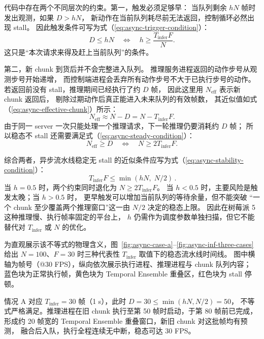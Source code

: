 代码中存在两个不同层次的约束。第一，触发必须足够早：
当队列剩余 $hN$ 帧时发出观测，如果 $D>hN$，
新动作在当前队列耗尽前无法返回，控制循环必然出现 stall。
因此触发条件可写为式（\ref{eq:async-trigger-condition}）：
\begin{equation}
  D \leq hN
  \quad\Longleftrightarrow\quad
  h \geq \frac{T_{\text{infer}}F}{N}.
  \label{eq:async-trigger-condition}
\end{equation}
这只是“本次请求来得及赶上当前队列”的条件。

第二，新 chunk 到货后并不会完整进入队列。
推理服务进程返回的动作步号从观测步号开始递增，
而控制端进程会丢弃所有动作步号不大于已执行步号的动作。
若返回前没有 stall，推理期间已经执行了约 $D$ 帧，
因此这里用 $N_{\text{eff}}$ 表示新 chunk 返回后，
剔除过期动作后真正能进入未来队列的有效帧数，
其近似值如式（\ref{eq:async-effective-chunk}）所示：
\begin{equation}
  N_{\text{eff}} \approx N - D = N - T_{\text{infer}}F.
  \label{eq:async-effective-chunk}
\end{equation}
由于同一 server 一次只能处理一个推理请求，下一轮推理仍要消耗约 $D$ 帧；
所以稳态不 stall 还需要满足式（\ref{eq:async-steady-condition}）：
\begin{equation}
  N_{\text{eff}} \geq D
  \quad\Longleftrightarrow\quad
  N \geq 2T_{\text{infer}}F.
  \label{eq:async-steady-condition}
\end{equation}

综合两者，异步流水线稳定无 stall 的近似条件应写为式（\ref{eq:async-stability-condition}）：
\begin{equation}
  \boxed{\,T_{\text{infer}}F \leq \min(hN,\; N/2)\,}.
  \label{eq:async-stability-condition}
\end{equation}
当 $h=0.5$ 时，两个约束同时退化为 $N \geq 2T_{\text{infer}}F$。
当 $h<0.5$ 时，主要风险是触发太晚；当 $h>0.5$ 时，
更早触发可以增加当前队列的等待余量，但不能突破
“一个 chunk 至少覆盖两个推理窗口”这一由 $N/2$ 决定的稳态上限。
因此在树莓派 5 这种推理慢、执行帧率固定的平台上，
$h$ 仍需作为调度参数单独扫描，但它不能替代对 $T_{\text{infer}}$ 或 $N$ 的优化。

为直观展示该不等式的物理含义，图~\ref{fig:async-case-a}--\ref{fig:async-inf-three-cases}
给出 $N=100$、$F=30$ 时三种代表性 $T_{\text{infer}}$ 取值下的稳态流水线时间线。
图中横轴为帧号（@30 FPS），纵向依次展示执行进程、推理进程与 chunk 队列内容；
蓝色块为正常执行帧，黄色块为 Temporal Ensemble 重叠区，红色块为 stall 停顿。

情况 A 对应 $T_{\text{infer}}=30$ 帧（1 s），此时 $D=30 \leq \min(hN,N/2)=50$，
不等式严格满足。推理进程在旧 chunk 执行至第 50 帧时启动，于第 80 帧前已完成，
形成约 20 帧宽的 Temporal Ensemble 重叠窗口，新旧 chunk 对这批帧均有预测，
融合后入队，执行全程连续无中断，稳态可达 30 FPS。

